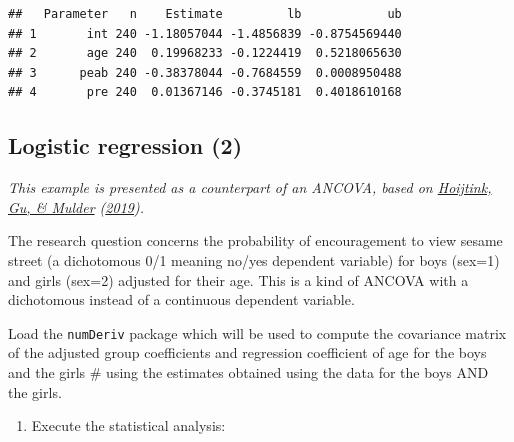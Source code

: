 \documentclass[
]{book}
\newenvironment{Shaded}{\begin{snugshade}}{\end{snugshade}}
\newcommand{\CommentTok}[1]{\textcolor[rgb]{0.56,0.35,0.01}{\textit{#1}}}
\newcommand{\FunctionTok}[1]{\textcolor[rgb]{0.00,0.00,0.00}{#1}}
\newcommand{\NormalTok}[1]{#1}
\newcommand{\OtherTok}[1]{\textcolor[rgb]{0.56,0.35,0.01}{#1}}
\newcommand{\SpecialCharTok}[1]{\textcolor[rgb]{0.00,0.00,0.00}{#1}}
\providecommand{\tightlist}{%
  \setlength{\itemsep}{0pt}\setlength{\parskip}{0pt}}
\begin{document}
\begin{verbatim}
##   Parameter   n    Estimate         lb            ub
## 1       int 240 -1.18057044 -1.4856839 -0.8754569440
## 2       age 240  0.19968233 -0.1224419  0.5218065630
## 3      peab 240 -0.38378044 -0.7684559  0.0008950488
## 4       pre 240  0.01367146 -0.3745181  0.4018610168
\end{verbatim}

\hypertarget{logistic-regression-2}{%
\subsection{Logistic regression (2)}\label{logistic-regression-2}}

\emph{This example is presented as a counterpart of an ANCOVA, based on \protect\hyperlink{ref-hoijtink2019bayesian}{Hoijtink, Gu, \& Mulder} (\protect\hyperlink{ref-hoijtink2019bayesian}{2019}).}

The research question concerns the probability of encouragement to view
sesame street (a dichotomous 0/1 meaning no/yes dependent variable) for
boys (sex=1) and girls (sex=2) adjusted for their age. This is a kind of
ANCOVA with a dichotomous instead of a continuous dependent variable.

Load the \texttt{numDeriv} package which will be used to compute the covariance matrix of the adjusted group coefficients and regression coefficient of age for the boys and the girls \# using the estimates obtained using the data for the boys AND the girls.

\begin{Shaded}
\end{Shaded}

\begin{enumerate}
\def\labelenumi{\arabic{enumi})}
\tightlist
\item
  Execute the statistical analysis:
\end{enumerate}
\end{document}
